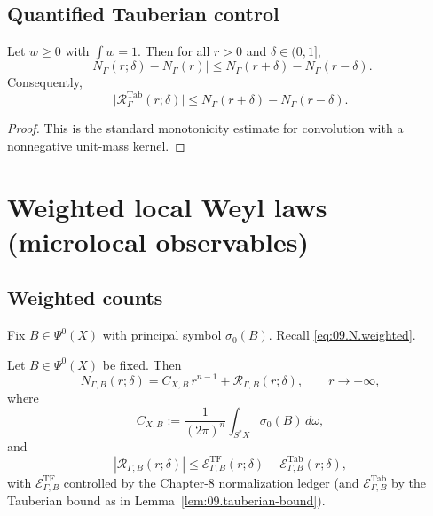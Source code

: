 \subsection{Quantified Tauberian control}\label{subsec:09.tauberian}

\begin{lemma}\label{lem:09.tauberian-bound}
Let $w\ge0$ with $\int w=1$. Then for all $r>0$ and $\delta\in(0,1]$,
\begin{equation}\label{eq:09.tauberian.bound}
\big|N_\Gamma(r;\delta)-N_\Gamma(r)\big|
\le
N_\Gamma(r+\delta)-N_\Gamma(r-\delta).
\end{equation}
Consequently,
\[
\big|\mathcal R^{\mathrm{Tab}}_\Gamma(r;\delta)\big|
\le
N_\Gamma(r+\delta)-N_\Gamma(r-\delta).
\]
\end{lemma}

\begin{proof}
This is the standard monotonicity estimate for convolution with a nonnegative unit-mass kernel.
\end{proof}

\section{Weighted local Weyl laws (microlocal observables)}
\label{sec:09.weighted}

\subsection{Weighted counts}\label{subsec:09.observable}

Fix $B\in\Psi^0(X)$ with principal symbol $\sigma_0(B)$. Recall \eqref{eq:09.N.weighted}.

\begin{theorem}\label{thm:09.weighted-weyl}
Let $B\in\Psi^0(X)$ be fixed. Then
\begin{equation}\label{eq:09.weighted.weyl}
N_{\Gamma,B}(r;\delta)=C_{X,B}\,r^{n-1}+\mathcal R_{\Gamma,B}(r;\delta),
\qquad r\to+\infty,
\end{equation}
where
\begin{equation}\label{eq:09.CXB}
C_{X,B}:=\frac{1}{(2\pi)^n}\int_{S^*X}\sigma_0(B)\,d\omega,
\end{equation}
and
\begin{equation}\label{eq:09.weighted.remainder}
|\mathcal R_{\Gamma,B}(r;\delta)|
\le
\mathcal E^{\mathrm{TF}}_{\Gamma,B}(r;\delta)+\mathcal E^{\mathrm{Tab}}_{\Gamma,B}(r;\delta),
\end{equation}
with $\mathcal E^{\mathrm{TF}}_{\Gamma,B}$ controlled by the Chapter-8 normalization ledger (and $\mathcal E^{\mathrm{Tab}}_{\Gamma,B}$
by the Tauberian bound as in Lemma~\ref{lem:09.tauberian-bound}).
\end{theorem}


